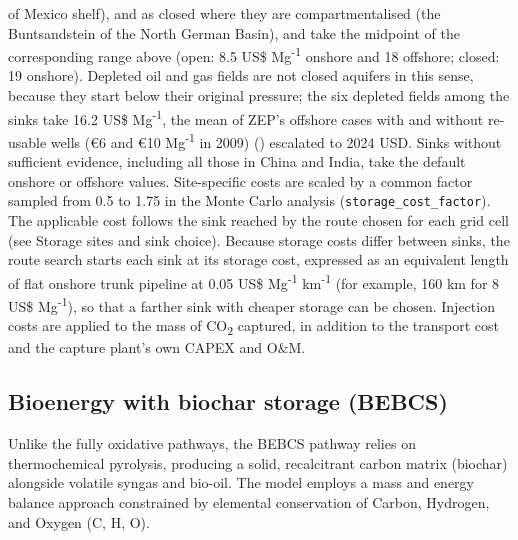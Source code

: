 \documentclass[
  letterpaper,
]{article}
\begin{document}
of Mexico shelf), and as closed where they are compartmentalised (the
Buntsandstein of the North German Basin), and take the midpoint of the
corresponding range above (open: 8.5 US\$ Mg\textsuperscript{-1} onshore
and 18 offshore; closed: 19 onshore). Depleted oil and gas fields are
not closed aquifers in this sense, because they start below their
original pressure; the six depleted fields among the sinks take 16.2
US\$ Mg\textsuperscript{-1}, the mean of ZEP's offshore cases with and
without re-usable wells (€6 and €10 Mg\textsuperscript{-1} in 2009)
() escalated to 2024 USD. Sinks without
sufficient evidence, including all those in China and India, take the
default onshore or offshore values. Site-specific costs are scaled by a
common factor sampled from 0.5 to 1.75 in the Monte Carlo analysis
(\texttt{storage\_cost\_factor}). The applicable cost follows the sink
reached by the route chosen for each grid cell (see Storage sites and
sink choice). Because storage costs differ between sinks, the route
search starts each sink at its storage cost, expressed as an equivalent
length of flat onshore trunk pipeline at 0.05 US\$
Mg\textsuperscript{-1} km\textsuperscript{-1} (for example, 160 km for 8
US\$ Mg\textsuperscript{-1}), so that a farther sink with cheaper
storage can be chosen. Injection costs are applied to the mass of
CO\textsubscript{2} captured, in addition to the transport cost and the
capture plant's own CAPEX and O\&M.

\subsection{Bioenergy with biochar storage
(BEBCS)}\label{bioenergy-with-biochar-storage-bebcs}

Unlike the fully oxidative pathways, the BEBCS pathway relies on
thermochemical pyrolysis, producing a solid, recalcitrant carbon matrix
(biochar) alongside volatile syngas and bio-oil. The model employs a
mass and energy balance approach constrained by elemental conservation
of Carbon, Hydrogen, and Oxygen (C, H, O).
\end{document}
